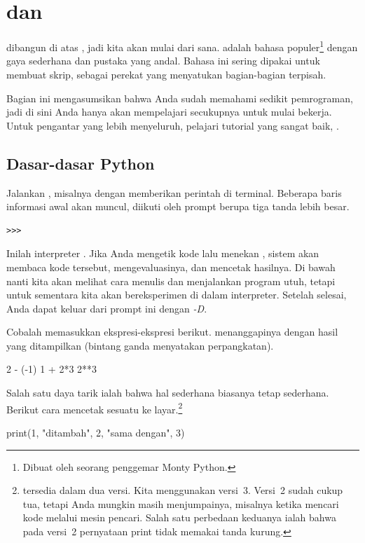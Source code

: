 \chapter{\python{} dan \Sage{}}

\Sage{} dibangun di atas \python{}, jadi kita akan mulai dari sana.
\python{} adalah bahasa populer\footnote{Dibuat oleh seorang penggemar
Monty Python.} 
dengan gaya sederhana dan pustaka yang andal.
Bahasa ini sering dipakai untuk membuat skrip, sebagai perekat yang menyatukan bagian-bagian terpisah.

Bagian ini mengasumsikan 
bahwa Anda sudah memahami sedikit pemrograman, jadi
di sini Anda hanya akan mempelajari \python{} secukupnya untuk mulai bekerja. 
Untuk pengantar yang lebih menyeluruh, pelajari tutorial \python{} yang sangat baik,
\cite{PythonTeam19b}.



\section{Dasar-dasar Python}
Jalankan \python, misalnya dengan memberikan perintah
di terminal.
Beberapa baris informasi awal akan muncul,
diikuti oleh prompt berupa tiga tanda
lebih besar.
\begin{lstlisting}[style=python]
>>>   
\end{lstlisting}
Inilah interpreter \python{}.
Jika Anda mengetik kode 
\python{} lalu menekan , sistem akan
membaca kode tersebut, mengevaluasinya, dan mencetak hasilnya.
Di bawah nanti kita akan melihat cara menulis dan menjalankan program utuh,
tetapi untuk sementara kita akan bereksperimen di dalam interpreter.
Setelah selesai, Anda dapat 
keluar dari prompt ini dengan \textit{-D}.

Cobalah memasukkan ekspresi-ekspresi berikut.
\python{} menanggapinya dengan hasil yang ditampilkan
(bintang ganda menyatakan perpangkatan).
\begin{pythonconsole}
2 - (-1)
1 + 2*3
2**3  
\end{pythonconsole}

Salah satu daya tarik \python{} ialah bahwa hal sederhana biasanya tetap sederhana.
Berikut cara mencetak sesuatu ke layar.\footnote{%
  \protect\python{} tersedia dalam dua versi.
  Kita menggunakan versi~3.
  Versi~2 sudah cukup tua, tetapi Anda mungkin masih menjumpainya, misalnya ketika
  mencari kode melalui mesin pencari.
  Salah satu perbedaan keduanya ialah bahwa pada versi~2 pernyataan
  print tidak memakai tanda kurung.}
\begin{pythonconsole}
print(1, "ditambah", 2, "sama dengan", 3)
\end{pythonconsole}

